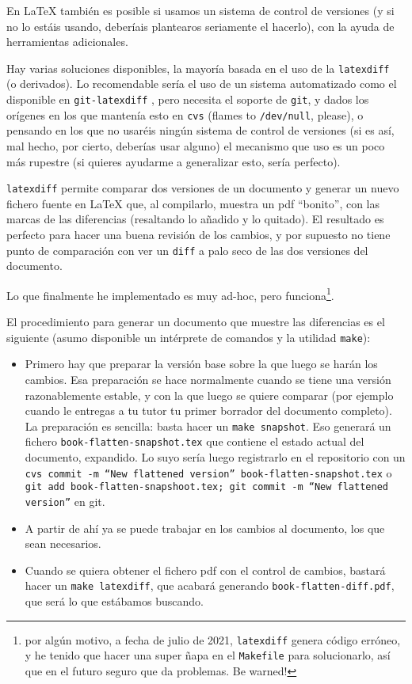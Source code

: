 {  En \LaTeX{} también es posible si usamos un sistema de control de versiones (y si no lo estáis usando, deberíais plantearos seriamente el hacerlo), con la ayuda de herramientas adicionales.

  Hay varias soluciones disponibles, la mayoría basada en el uso de la \texttt{latexdiff}~\cite{latexdiff} (o derivados). Lo recomendable sería el uso de un sistema automatizado como el disponible en \texttt{git-latexdiff} \cite{git-latexdiff}, pero necesita el soporte de \texttt{git}, y dados los orígenes en los que mantenía esto en \texttt{cvs} (flames to \texttt{/dev/null}, please), o pensando en los que no usaréis ningún sistema de control de versiones (si es así, mal hecho, por cierto, deberías usar alguno) el mecanismo que uso es un poco más rupestre (si quieres ayudarme a generalizar esto, sería perfecto).

  \texttt{latexdiff} permite comparar dos versiones de un documento y generar un nuevo fichero fuente en \LaTeX{} que, al compilarlo, muestra un pdf ``bonito'', con las marcas de las diferencias (resaltando lo añadido y lo quitado). El resultado es perfecto para hacer una buena revisión de los cambios, y por supuesto no tiene punto de comparación con ver un \texttt{diff} a palo seco de las dos versiones del documento.

  Lo que finalmente he implementado es muy ad-hoc, pero funciona\footnote{por algún motivo, a fecha de julio de 2021, \texttt{latexdiff} genera código erróneo, y he tenido que hacer una super ñapa en el \texttt{Makefile} para solucionarlo, así que en el futuro seguro que da problemas. Be warned!}.

  El procedimiento para generar un documento que muestre las diferencias es el siguiente (asumo disponible un intérprete de comandos y la utilidad \texttt{make}):

  \begin{itemize}
    \item Primero hay que preparar la versión base sobre la que luego se harán los cambios. Esa preparación se hace normalmente cuando se tiene una versión razonablemente estable, y con la que luego se quiere comparar (por ejemplo cuando le entregas a tu tutor tu primer borrador del documento completo). La preparación es sencilla: basta hacer un \texttt{make snapshot}. Eso generará un fichero \texttt{book-flatten-snapshot.tex} que contiene el estado actual del documento, expandido. Lo suyo sería luego registrarlo en el repositorio con un \texttt{cvs commit -m ``New flattened version'' book-flatten-snapshot.tex} o \texttt{git add book-flatten-snapshoot.tex; git commit -m ``New flattened version''} en git.
    \item A partir de ahí ya se puede trabajar en los cambios al documento, los que sean necesarios.
    \item Cuando se quiera obtener el fichero pdf con el control de cambios, bastará hacer un \texttt{make latexdiff}, que acabará generando \texttt{book-flatten-diff.pdf}, que será lo que estábamos buscando.


\end{itemize}}
